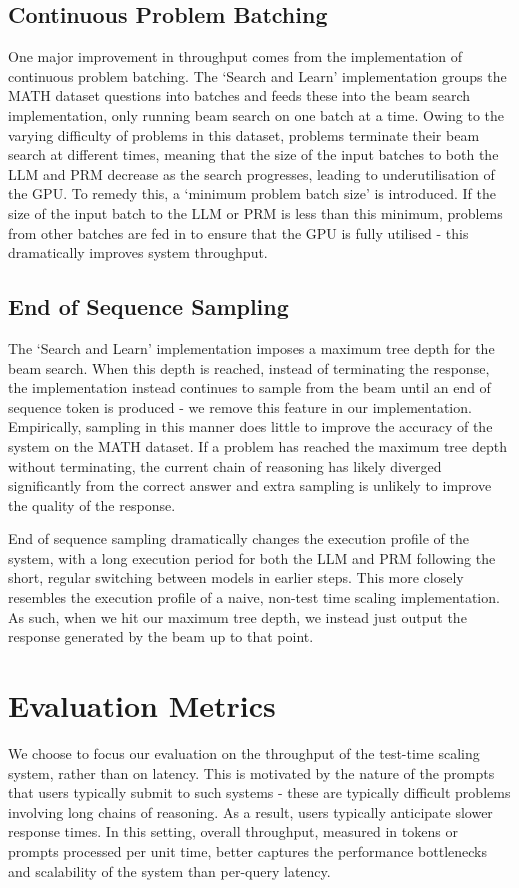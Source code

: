 \documentclass[12pt,twoside]{report}
\begin{document}
\subsection{Continuous Problem Batching}
One major improvement in throughput comes from the implementation of continuous problem batching.
The `Search and Learn' implementation groups the MATH dataset questions into batches and feeds these into the beam search implementation, only running beam search on one batch at a time.
Owing to the varying difficulty of problems in this dataset, problems terminate their beam search at different times, meaning that the size of the input batches to both the LLM and PRM decrease as the search progresses, leading to underutilisation of the GPU.
To remedy this, a `minimum problem batch size' is introduced.
If the size of the input batch to the LLM or PRM is less than this minimum, problems from other batches are fed in to ensure that the GPU is fully utilised - this dramatically improves system throughput.

\subsection{End of Sequence Sampling}
The `Search and Learn' implementation imposes a maximum tree depth for the beam search.
When this depth is reached, instead of terminating the response, the implementation instead continues to sample from the beam until an end of sequence token is produced - we remove this feature in our implementation.
Empirically, sampling in this manner does little to improve the accuracy of the system on the MATH dataset.
If a problem has reached the maximum tree depth without terminating, the current chain of reasoning has likely diverged significantly from the correct answer and extra sampling is unlikely to improve the quality of the response.

End of sequence sampling dramatically changes the execution profile of the system, with a long execution period for both the LLM and PRM following the short, regular switching between models in earlier steps.
This more closely resembles the execution profile of a naive, non-test time scaling implementation. %
As such, when we hit our maximum tree depth, we instead just output the response generated by the beam up to that point. 

\section{Evaluation Metrics}
We choose to focus our evaluation on the throughput of the test-time scaling system, rather than on latency.
This is motivated by the nature of the prompts that users typically submit to such systems - these are typically difficult problems involving long chains of reasoning.
As a result, users typically anticipate slower response times. 
In this setting, overall throughput, measured in tokens or prompts processed per unit time, better captures the performance bottlenecks and scalability of the system than per-query latency.
\end{document}
